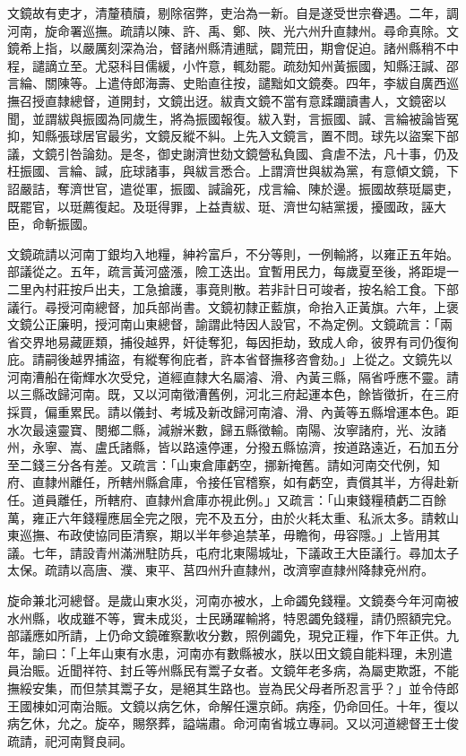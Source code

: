 \begin{pinyinscope}
文鏡故有吏才，清釐積牘，剔除宿弊，吏治為一新。自是遂受世宗眷遇。二年，調河南，旋命署巡撫。疏請以陳、許、禹、鄭、陜、光六州升直隸州。尋命真除。文鏡希上指，以嚴厲刻深為治，督諸州縣清逋賦，闢荒田，期會促迫。諸州縣稍不中程，譴謫立至。尤惡科目儒緩，小忤意，輒劾罷。疏劾知州黃振國，知縣汪諴、邵言綸、關陳等。上遣侍郎海壽、史貽直往按，譴黜如文鏡奏。四年，李紱自廣西巡撫召授直隸總督，道開封，文鏡出迓。紱責文鏡不當有意蹂躪讀書人，文鏡密以聞，並謂紱與振國為同歲生，將為振國報復。紱入對，言振國、諴、言綸被論皆冤抑，知縣張球居官最劣，文鏡反縱不糾。上先入文鏡言，置不問。球先以盜案下部議，文鏡引咎論劾。是冬，御史謝濟世劾文鏡營私負國、貪虐不法，凡十事，仍及枉振國、言綸、諴，庇球諸事，與紱言悉合。上謂濟世與紱為黨，有意傾文鏡，下詔嚴詰，奪濟世官，遣從軍，振國、諴論死，戍言綸、陳於邊。振國故蔡珽屬吏，既罷官，以珽薦復起。及珽得罪，上益責紱、珽、濟世勾結黨援，擾國政，誣大臣，命斬振國。

文鏡疏請以河南丁銀均入地糧，紳衿富戶，不分等則，一例輸將，以雍正五年始。部議從之。五年，疏言黃河盛漲，險工迭出。宜暫用民力，每歲夏至後，將距堤一二里內村莊按戶出夫，工急搶護，事竟則散。若非計日可竣者，按名給工食。下部議行。尋授河南總督，加兵部尚書。文鏡初隸正藍旗，命抬入正黃旗。六年，上褒文鏡公正廉明，授河南山東總督，諭謂此特因人設官，不為定例。文鏡疏言：「兩省交界地易藏匪類，捕役越界，奸徒奪犯，每因拒劫，致成人命，彼界有司仍復徇庇。請嗣後越界捕盜，有縱奪徇庇者，許本省督撫移咨會劾。」上從之。文鏡先以河南漕船在衛輝水次受兌，道經直隸大名屬濬、滑、內黃三縣，隔省呼應不靈。請以三縣改歸河南。既，又以河南徵漕舊例，河北三府起運本色，餘皆徵折，在三府採買，偏重累民。請以儀封、考城及新改歸河南濬、滑、內黃等五縣增運本色。距水次最遠靈寶、閿鄉二縣，減辦米數，歸五縣徵輸。南陽、汝寧諸府，光、汝諸州，永寧、嵩、盧氏諸縣，皆以路遠停運，分撥五縣協濟，按道路遠近，石加五分至二錢三分各有差。又疏言：「山東倉庫虧空，挪新掩舊。請如河南交代例，知府、直隸州離任，所轄州縣倉庫，令接任官稽察，如有虧空，責償其半，方得赴新任。道員離任，所轄府、直隸州倉庫亦視此例。」又疏言：「山東錢糧積虧二百餘萬，雍正六年錢糧應屆全完之限，完不及五分，由於火耗太重、私派太多。請敕山東巡撫、布政使協同臣清察，期以半年參追禁革，毋瞻徇，毋容隱。」上皆用其議。七年，請設青州滿洲駐防兵，屯府北東陽城址，下議政王大臣議行。尋加太子太保。疏請以高唐、濮、東平、莒四州升直隸州，改濟寧直隸州降隸兗州府。

旋命兼北河總督。是歲山東水災，河南亦被水，上命蠲免錢糧。文鏡奏今年河南被水州縣，收成雖不等，實未成災，士民踴躍輸將，特恩蠲免錢糧，請仍照額完兌。部議應如所請，上仍命文鏡確察歉收分數，照例蠲免，現兌正糧，作下年正供。九年，諭曰：「上年山東有水患，河南亦有數縣被水，朕以田文鏡自能料理，未別遣員治賑。近聞祥符、封丘等州縣民有鬻子女者。文鏡年老多病，為屬吏欺誑，不能撫綏安集，而但禁其鬻子女，是絕其生路也。豈為民父母者所忍言乎？」並令侍郎王國棟如河南治賑。文鏡以病乞休，命解任還京師。病痊，仍命回任。十年，復以病乞休，允之。旋卒，賜祭葬，謚端肅。命河南省城立專祠。又以河道總督王士俊疏請，祀河南賢良祠。


\end{pinyinscope}
